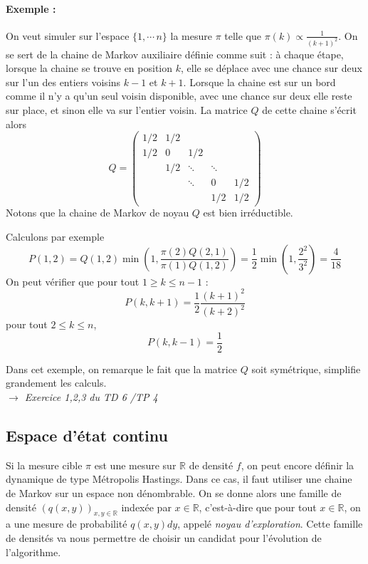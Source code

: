 \documentclass[a4paper,12pt]{book}
\begin{document}
\paragraph{Exemple :}

On veut simuler sur l'espace $\{1,\cdots\, n\}$ la mesure $\pi$ telle que $\pi(k)\propto\frac{1}{(k+1)^2}$. On se sert de la chaine de Markov auxiliaire définie comme suit : à chaque étape, lorsque la chaine se trouve en position $k$, elle se déplace avec une chance sur deux sur l'un des entiers voisins $k-1$ et $k+1$. Lorsque la chaine est sur un bord comme il n'y a qu'un seul voisin disponible, avec une chance sur deux elle reste sur place, et sinon elle va sur l'entier voisin. La matrice $Q$ de cette chaine s'écrit alors
$$Q=\begin{pmatrix}
1/2 & 1/2 & &  & \\
1/2 & 0 & 1/2 & & \\
 & 1/2 & \ddots & \ddots & \\
 &  & \ddots & 0 & 1/2 \\
 &  &  & 1/2 & 1/2
\end{pmatrix}$$
Notons que la chaine de Markov de noyau $Q$ est bien irréductible.

Calculons par exemple
$$P(1,2)= Q(1,2) \min (1, \frac{\pi(2)Q(2,1)}{\pi(1)Q(1,2)} )= \frac12 \min(1, \frac{2^2}{3^2}) =\frac{4}{18}$$
On peut vérifier que pour tout $1\ge k\le n-1$ :
$$P(k,k+1) = \frac12 \frac{(k+1)^2}{(k+2)^2}$$
pour tout $2\le k\le n$, $$P(k,k-1)=\frac12$$

Dans cet exemple, on remarque le fait que la matrice $Q$ soit symétrique, simplifie grandement les calculs.\\


\textit{ $\rightarrow$ Exercice 1,2,3 du TD 6 /TP 4}



\subsection{Espace d'état continu}
Si la mesure cible $\pi$ est une mesure sur $\mathbb{R}$ de densité $f$, on peut encore définir la dynamique de type Métropolis Hastings. Dans ce cas, il faut utiliser une chaine de Markov sur un espace non dénombrable. On se donne alors une famille de densité $(q(x,y))_{x,y\in \mathbb{R}}$ indexée par $x\in \mathbb{R}$, c'est-à-dire que pour tout $x\in\mathbb{R}$, on a une mesure de probabilité $q(x,y)dy$, appelé \emph{noyau d'exploration}. Cette famille de densités va nous permettre de choisir un candidat pour l'évolution de l'algorithme.
\end{document}
